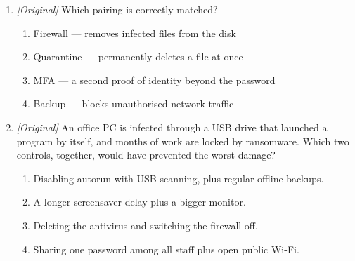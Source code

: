 \begin{enumerate}[label=\textbf{Q\arabic*.}, leftmargin=*]
\begin{enumerate}[label=\Roman*.]
    \item An offline backup lets work resume after ransomware locks files.
  \end{enumerate}
  \begin{enumerate}[label=\Alph*.]
    \item I only
    \item II and III only
    \item I and II only
    \item I, II, and III
  \end{enumerate}
\item \textit{[Original]} Which pairing is correctly matched?
  \begin{enumerate}[label=\Alph*.]
    \item Firewall --- removes infected files from the disk
    \item Quarantine --- permanently deletes a file at once
    \item MFA --- a second proof of identity beyond the password
    \item Backup --- blocks unauthorised network traffic
  \end{enumerate}
\item \textit{[Original]} An office PC is infected through a USB drive that
  launched a program by itself, and months of work are locked by ransomware.
  Which two controls, together, would have prevented the worst damage?
  \begin{enumerate}[label=\Alph*.]
    \item Disabling autorun with USB scanning, plus regular offline backups.
    \item A longer screensaver delay plus a bigger monitor.
    \item Deleting the antivirus and switching the firewall off.
    \item Sharing one password among all staff plus open public Wi-Fi.
  \end{enumerate}


\end{enumerate}
